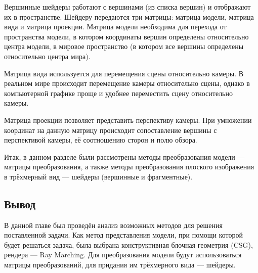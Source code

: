 Вершинные  шейдеры  работают  с  вершинами  (из  списка  вершин)  и 
отображают  их  в  пространстве.
Шейдеру  передаются  три  матрицы:  матрица модели, матрица вида и матрица проекции.
Матрица  модели  необходима  для  перехода  от  пространства  модели,  в 
котором  координаты  вершин  определены  относительно  центра  модели,  в 
мировое пространство (в котором все вершины определены относительно центра 
мира).

Матрица вида используется для перемещения сцены относительно камеры.
В реальном мире происходит перемещение камеры относительно сцены, однако 
в  компьютерной  графике  проще  и  удобнее  переместить  сцену 
относительно камеры.

Матрица  проекции  позволяет  представить  перспективу  камеры.
При умножении координат на данную матрицу происходит сопоставление вершины с перспективой камеры, её соотношению сторон и полю обзора.




Итак, в данном разделе были рассмотрены методы преобразования модели 
--- матрицы  преобразования,  а  также  методы  преобразования  плоского 
изображения в трёхмерный вид --- шейдеры (вершинные и фрагментные). 

\subsection*{Вывод}
В  данной  главе  был  проведён  анализ  возможных  методов  для  решения 
поставленной задачи.
Как метод представления  модели, при помощи которой будет 
решаться  задача,  была  выбрана  конструктивная  блочная геометрия  (CSG), 
рендера  ---  Ray Marching.
Для  преобразования  модели  будут  использоваться 
матрицы преобразований, для придания им трёхмерного вида --- шейдеры.

